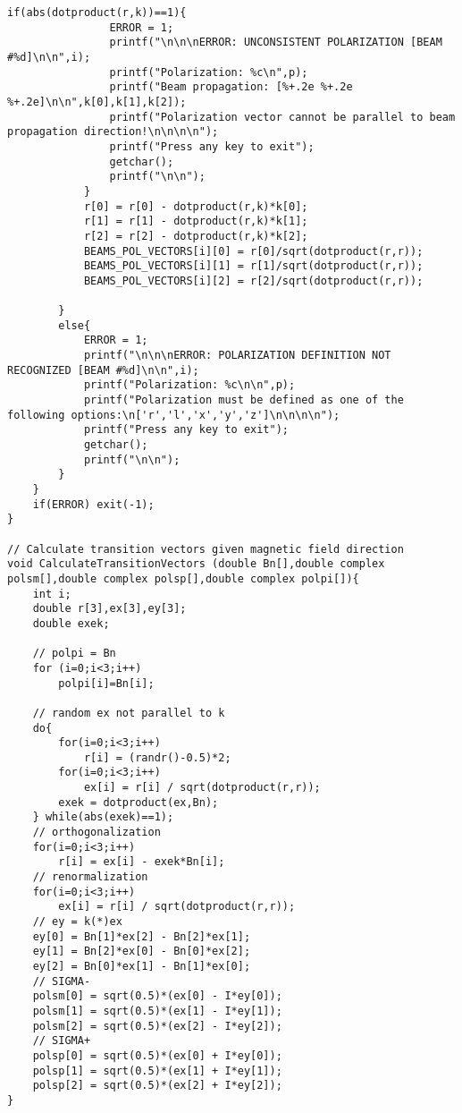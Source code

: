 \begin{lstlisting}[style=CStyle]
            if(abs(dotproduct(r,k))==1){
                ERROR = 1;
                printf("\n\n\nERROR: UNCONSISTENT POLARIZATION [BEAM #%d]\n\n",i);
                printf("Polarization: %c\n",p);
                printf("Beam propagation: [%+.2e %+.2e %+.2e]\n\n",k[0],k[1],k[2]);
                printf("Polarization vector cannot be parallel to beam propagation direction!\n\n\n\n");
                printf("Press any key to exit");
                getchar();
                printf("\n\n");
            }
            r[0] = r[0] - dotproduct(r,k)*k[0];
            r[1] = r[1] - dotproduct(r,k)*k[1];
            r[2] = r[2] - dotproduct(r,k)*k[2];
            BEAMS_POL_VECTORS[i][0] = r[0]/sqrt(dotproduct(r,r));
            BEAMS_POL_VECTORS[i][1] = r[1]/sqrt(dotproduct(r,r));
            BEAMS_POL_VECTORS[i][2] = r[2]/sqrt(dotproduct(r,r));

        }
        else{
            ERROR = 1;
            printf("\n\n\nERROR: POLARIZATION DEFINITION NOT RECOGNIZED [BEAM #%d]\n\n",i);
            printf("Polarization: %c\n\n",p);
            printf("Polarization must be defined as one of the following options:\n['r','l','x','y','z']\n\n\n\n");
            printf("Press any key to exit");
            getchar();
            printf("\n\n");
        }
    }
    if(ERROR) exit(-1);
}

// Calculate transition vectors given magnetic field direction
void CalculateTransitionVectors (double Bn[],double complex polsm[],double complex polsp[],double complex polpi[]){
    int i;
    double r[3],ex[3],ey[3];
    double exek;

    // polpi = Bn
    for (i=0;i<3;i++)
        polpi[i]=Bn[i];

    // random ex not parallel to k
    do{
        for(i=0;i<3;i++)
            r[i] = (randr()-0.5)*2;
        for(i=0;i<3;i++)
            ex[i] = r[i] / sqrt(dotproduct(r,r));
        exek = dotproduct(ex,Bn);
    } while(abs(exek)==1);
    // orthogonalization
    for(i=0;i<3;i++)
        r[i] = ex[i] - exek*Bn[i];
    // renormalization
    for(i=0;i<3;i++)
        ex[i] = r[i] / sqrt(dotproduct(r,r));
    // ey = k(*)ex
    ey[0] = Bn[1]*ex[2] - Bn[2]*ex[1];
    ey[1] = Bn[2]*ex[0] - Bn[0]*ex[2];
    ey[2] = Bn[0]*ex[1] - Bn[1]*ex[0];
    // SIGMA-
    polsm[0] = sqrt(0.5)*(ex[0] - I*ey[0]);
    polsm[1] = sqrt(0.5)*(ex[1] - I*ey[1]);
    polsm[2] = sqrt(0.5)*(ex[2] - I*ey[2]);
    // SIGMA+
    polsp[0] = sqrt(0.5)*(ex[0] + I*ey[0]);
    polsp[1] = sqrt(0.5)*(ex[1] + I*ey[1]);
    polsp[2] = sqrt(0.5)*(ex[2] + I*ey[2]);
}


\end{lstlisting}
